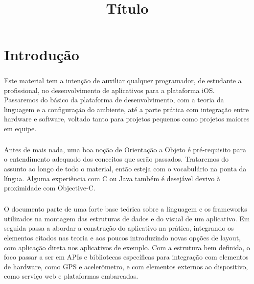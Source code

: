 \documentclass[a4paper,12pt,brazil,doubleside]{book}
\title{Título}
\begin{document}



\cleardoublepage

\onehalfspace

\pagestyle{plain}

\setcounter{tocdepth}{1} %
\tableofcontents
\clearpage %

\lstset{language=[Objective]C}

\listoffigures
{}
\clearpage %
\thispagestyle{empty}

\lstlistoflistings
{}
\clearpage %
\thispagestyle{empty}

\chapter{Introdução}

\paragraph{}Este material tem a intenção de auxiliar qualquer programador, de estudante a profissional, no desenvolvimento de aplicativos para a plataforma iOS. Passaremos do básico da plataforma de desenvolvimento, com a teoria da linguagem e a configuração do ambiente, até a parte prática com integração entre hardware e software, voltado tanto para projetos pequenos como projetos maiores em equipe.
\paragraph{}Antes de mais nada, uma boa noção de Orientação a Objeto é pré-requisito para o entendimento adequado dos conceitos que serão passados. Trataremos do assunto ao longo de todo o material, então esteja com o vocabulário na ponta da língua. Alguma experiência com C ou Java também é desejável devivo à proximidade com Objective-C.
\paragraph{}O documento parte de uma forte base teórica sobre a linguagem e os frameworks utilizados na montagem das estruturas de dados e do visual de um aplicativo. Em seguida passa a abordar a construção do aplicativo na prática, integrando os elementos citados nas teoria e aos poucos introduzindo novas opções de layout, com aplicação direta nos aplicativos de exemplo. Com a estrutura bem definida, o foco passar a ser em APIs e bibliotecas específicas para integração com elementos de hardware, como GPS e acelerômetro, e com elementos externos ao dispositivo, como serviço web e plataformas embarcadas.
\end{document}
